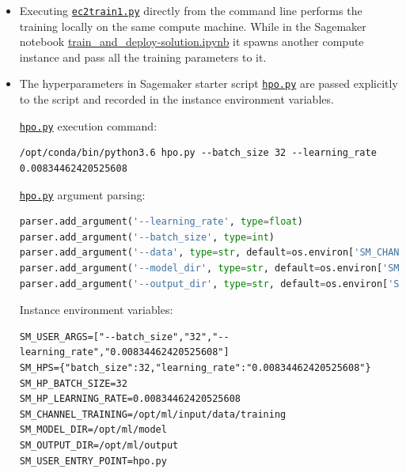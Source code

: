 \documentclass[a4paper
]{article}
\providecommand{\tightlist}{%
  \setlength{\itemsep}{0pt}\setlength{\parskip}{0pt}}
\begin{document}
\begin{itemize}
\tightlist

\item Executing
\href{https://github.com/FadyMorris/udacity-AWS-ml-engineer-nanodegree/tree/main/projects/04_operationalizing-an-aws-ml-project/ec2train1.py}{\texttt{ec2train1.py}} directly from the command
line performs the training locally on the same compute machine. While in
the Sagemaker notebook \url{train_and_deploy-solution.ipynb} it spawns
another compute instance and pass all the training parameters to it.

\item The hyperparameters in Sagemaker starter script
\href{https://github.com/FadyMorris/udacity-AWS-ml-engineer-nanodegree/tree/main/projects/04_operationalizing-an-aws-ml-project/hpo.py}{\texttt{hpo.py}} are passed explicitly to the script and
recorded in the instance environment variables.

\href{https://github.com/FadyMorris/udacity-AWS-ml-engineer-nanodegree/tree/main/projects/04_operationalizing-an-aws-ml-project/hpo.py}{\texttt{hpo.py}} execution command:

\begin{lstlisting}[]
/opt/conda/bin/python3.6 hpo.py --batch_size 32 --learning_rate 0.00834462420525608
\end{lstlisting}

\href{https://github.com/FadyMorris/udacity-AWS-ml-engineer-nanodegree/tree/main/projects/04_operationalizing-an-aws-ml-project/hpo.py}{\texttt{hpo.py}} argument parsing:

\begin{lstlisting}[language=Python]
parser.add_argument('--learning_rate', type=float)
parser.add_argument('--batch_size', type=int)
parser.add_argument('--data', type=str, default=os.environ['SM_CHANNEL_TRAINING'])
parser.add_argument('--model_dir', type=str, default=os.environ['SM_MODEL_DIR'])
parser.add_argument('--output_dir', type=str, default=os.environ['SM_OUTPUT_DATA_DIR'])
\end{lstlisting}

Instance environment variables:

\begin{lstlisting}
SM_USER_ARGS=["--batch_size","32","--learning_rate","0.00834462420525608"]
SM_HPS={"batch_size":32,"learning_rate":"0.00834462420525608"}
SM_HP_BATCH_SIZE=32
SM_HP_LEARNING_RATE=0.00834462420525608
SM_CHANNEL_TRAINING=/opt/ml/input/data/training
SM_MODEL_DIR=/opt/ml/model
SM_OUTPUT_DIR=/opt/ml/output
SM_USER_ENTRY_POINT=hpo.py
\end{lstlisting}


\end{itemize}
\end{document}
